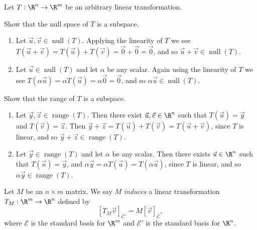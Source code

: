 \documentclass{problemset}
\DeclareMathOperator{\Range}{range}
\DeclareMathOperator{\Null}{null}
\begin{document}
	\question
	Let $T:\R^n\to\R^m$ be an arbitrary linear transformation.
	\begin{parts}
		\item Show that the null space of $T$ is a subspace.
			\begin{solution}
				\begin{enumerate}[label=(\roman*)]
					\item Let $\vec u,\vec v\in\Null(T)$. 
						Applying the linearity of $T$ we see
						$T(\vec u+\vec v)=T(\vec u)+T(\vec v)=\vec 0+\vec 0=\vec 0$,
						and so $\vec u+\vec v\in\Null(T)$. 
					\item Let $\vec u\in\Null(T)$ and let $\alpha$ be any scalar.
						Again using the linearity of $T$ we see
						$T(\alpha\vec u)=\alpha T(\vec u)=\alpha\vec 0=\vec 0$,
						and so $\alpha\vec u\in\Null(T)$.
				\end{enumerate}
			\end{solution}
		\item Show that the range of $T$ is a subspace.
			\begin{solution}
				\begin{enumerate}[label=(\roman*)]
					\item Let $\vec y,\vec z\in\Range(T)$. 
						Then there exist $\vec u,\vec v\in\R^n$ such that $T(\vec u)=\vec y$
						and $T(\vec v)=\vec z$. Then
						$\vec y+\vec z=T(\vec u)+T(\vec v)=T(\vec u+\vec v)$,
						since $T$ is linear, and so $\vec y+\vec z\in\Range(T)$. 
					\item Let $\vec y\in\Range(T)$ and let $\alpha$ be any scalar.
						Then there exists $\vec u\in\R^n$ such that $T(\vec u)=\vec y$,
						and $\alpha\vec y=\alpha T(\vec u)=T(\alpha\vec u)$, 
						since $T$ is linear, and so $\alpha\vec y\in\Range(T)$.
				\end{enumerate}

			\end{solution}
	\end{parts}

	\begin{definition}
		Let $M$ be an $n\times m$ matrix. We say $M$ \emph{induces} 
		a linear transformation $T_M:\R^m\to\R^n$ defined by
		\[
			[T_M\vec v]_{\mathcal E'} = M[\vec v]_{\mathcal E},
		\]
		where $\mathcal E$ is the standard basis for $\R^m$ and $\mathcal E'$
		is the standard basis for $\R^n$.
	\end{definition}
\end{document}
